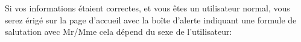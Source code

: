 \documentclass{article}
\begin{document}
\begin{enumerate}
\vspace{0.4cm}
\hspace*{-0.7in}
               \noindent{}
























	Si vos informations étaient correctes, et vous êtes un utilisateur normal, vous serez érigé sur la page d'accueil avec la boîte d'alerte indiquant une formule de salutation avec Mr/Mme cela dépend du sexe de l'utilisateur:



   
   
   
   \hspace*{-0.7in}
               \noindent{}



\end{enumerate}
\end{document}
